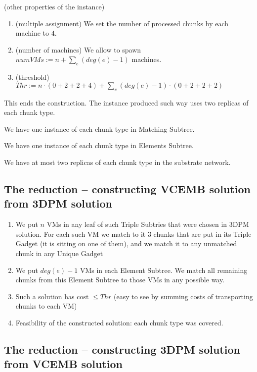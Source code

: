 (other properties of the instance)
\begin{enumerate}
\item (multiple assignment) We set the number of processed chunks by
  each machine to 4.
\item (number of machines) We allow to spawn
  $numVMs := n + \sum_{e}(deg(e)-1)$ machines.
\item (threshold)
  $Thr := n\cdot (0 + 2 + 2 + 4) + \sum_{e}(deg(e)-1)\cdot (0 + 2 + 2 + 2)$
\end{enumerate}

This ends the construction. The instance produced such way uses two replicas of each chunk type.

\begin{obs}
We have one instance of each chunk type in Matching Subtree.
\end{obs}

\begin{obs}
We have one instance of each chunk type in Elements Subtree.
\end{obs}

\begin{corollary}
We have at most two replicas of each chunk type in the substrate network.
\end{corollary}


\subsection{The reduction -- constructing VCEMB solution from 3DPM
  solution}

\begin{enumerate}
  \item We put $n$ VMs in any leaf of such Triple Subtries that were
  chosen in 3DPM solution. For each such VM we match to it 3 chunks
  that are put in its Triple Gadget (it is sitting on one of them),
  and we match it to any unmatched chunk in any Unique Gadget
  \item We put $deg(e)-1$ VMs in each Element Subtree. We match all remaining
  chunks from this Element Subtree to those VMs in any possible
  way.
  \item Such a solution has cost $\leq Thr$ (easy to see by
  summing costs of transporting chunks to each VM)
  \item Feasibility of the constructed solution: each chunk type was covered.
\end{enumerate}

\subsection{The reduction -- constructing 3DPM solution from VCEMB
  solution}

